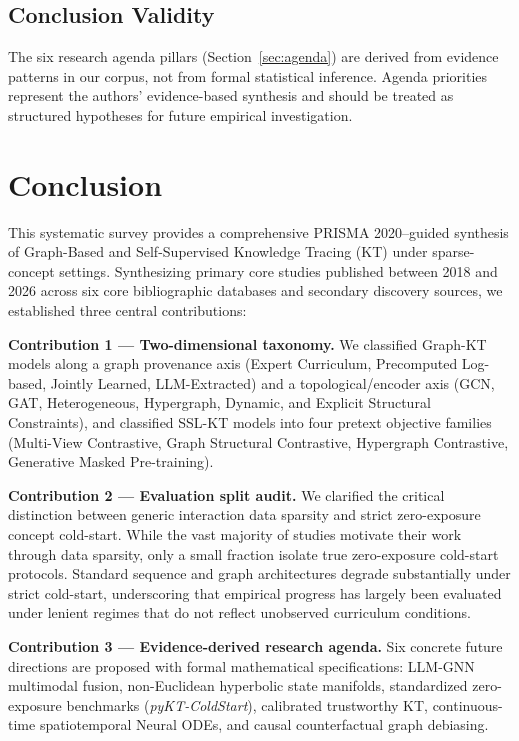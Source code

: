 \documentclass[10pt,journal,compsoc]{IEEEtran}
\begin{document}
\subsection{Conclusion Validity}
The six research agenda pillars (Section~\ref{sec:agenda}) are derived from evidence patterns in our corpus, not from formal statistical inference. Agenda priorities represent the authors' evidence-based synthesis and should be treated as structured hypotheses for future empirical investigation.

\section{Conclusion}
\label{sec:conclusion}

This systematic survey provides a comprehensive PRISMA 2020--guided synthesis of Graph-Based and Self-Supervised Knowledge Tracing (KT) under sparse-concept settings. Synthesizing primary core studies published between 2018 and 2026 across six core bibliographic databases and secondary discovery sources, we established three central contributions:

\textbf{Contribution 1 — Two-dimensional taxonomy.} We classified Graph-KT models along a graph provenance axis (Expert Curriculum, Precomputed Log-based, Jointly Learned, LLM-Extracted) and a topological/encoder axis (GCN, GAT, Heterogeneous, Hypergraph, Dynamic, and Explicit Structural Constraints), and classified SSL-KT models into four pretext objective families (Multi-View Contrastive, Graph Structural Contrastive, Hypergraph Contrastive, Generative Masked Pre-training).

\textbf{Contribution 2 — Evaluation split audit.} We clarified the critical distinction between generic interaction data sparsity and strict zero-exposure concept cold-start. While the vast majority of studies motivate their work through data sparsity, only a small fraction isolate true zero-exposure cold-start protocols. Standard sequence and graph architectures degrade substantially under strict cold-start, underscoring that empirical progress has largely been evaluated under lenient regimes that do not reflect unobserved curriculum conditions.

\textbf{Contribution 3 — Evidence-derived research agenda.} Six concrete future directions are proposed with formal mathematical specifications: LLM-GNN multimodal fusion, non-Euclidean hyperbolic state manifolds, standardized zero-exposure benchmarks (\textit{pyKT-ColdStart}), calibrated trustworthy KT, continuous-time spatiotemporal Neural ODEs, and causal counterfactual graph debiasing.
\end{document}
